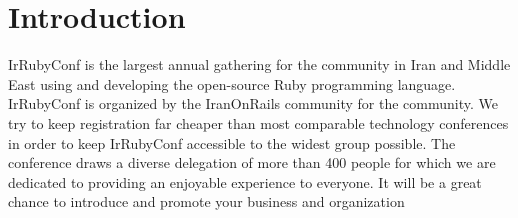 \documentclass[a4paper,12pt]{article}
\newcommand{\Title}{IrRubyConf 2015}
\newcommand{\SubTitle}{Sponsorship proposal}
\begin{document}

\newpage
\tableofcontents
\newpage


\section*{Introduction}
IrRubyConf is the largest annual gathering for the community in Iran and Middle East using and developing the open-source Ruby programming language. IrRubyConf is organized by the IranOnRails community for the community. We try to keep registration far cheaper than most comparable technology conferences in order to keep IrRubyConf accessible to the widest group possible. The conference draws a diverse delegation of more than 400 people for which we are dedicated to providing an enjoyable experience to everyone. It will be a great chance to introduce and promote your business and organization
\end{document}
